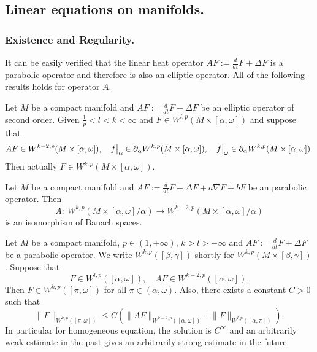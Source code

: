 \subsection{Linear equations on manifolds.}
\label{sec:org06823dd}

\subsubsection{Existence and Regularity.}
\label{sec:org8997e62}

It can be easily verified that the linear heat operator \(AF:= \frac{d}{dt}F + \Delta F\)
is a parabolic operator and therefore is also an elliptic operator. All of the following results
holds for operator \(A\).

\begin{theorem}
\label{thm:elliptic-d}
Let \(M\) be a compact manifold and \(AF:= \frac{d}{dt}F + \Delta F\) be an elliptic
operator of second order. Given \(\frac{1}{p} < l < k <\infty\) and \(F\in
W^{l,p}(M\times[\alpha,\omega])\) and suppose that 
\[
 AF\in W^{k-2,p}(M\times[\alpha,\omega]),\quad \restr{f}{\alpha}\in \partial_\alpha
W^{k,p}(M\times[\alpha,\omega]), \quad  \restr{f}{\omega}\in \partial_\alpha W^{k,p}(M\times[\alpha,\omega]).
\]
Then actually \(F\in W^{k,p}(M\times[\alpha,\omega])\).
\end{theorem}


\begin{theorem}
\label{thm:para-existence-d}
Let \(M\) be a compact manifold and \(AF:= \frac{d}{dt}F + \Delta F + a\nabla F + bF\) be an parabolic
operator. Then 
\[
 A:\ W^{k,p}(M\times[\alpha,\omega]/\alpha) \longrightarrow W^{k-2,p}(M\times[\alpha,\omega]/\alpha)
\]
is an isomorphism of Banach spaces.
\end{theorem}


\begin{theorem}
\label{thm:para-eq-d }
Let \(M\) be a compact manifold, \(p\in (1,+\infty)\), \(k > l > -\infty\) and \(AF:= \frac{d}{dt}F + \Delta F\) be a parabolic operator. We write \(W^{k,p}([\beta,\gamma])\) shortly for \(W^{k,p}(M\times[\beta,\gamma])\). Suppose that
\[
 F\in W^{l,p}([\alpha,\omega]),\quad AF\in W^{k-2,p}([\alpha,\omega]).
\]
Then \(F\in W^{k,p}([\pi,\omega])\) for all \(\pi\in (\alpha,\omega)\). Also, there
exists a constant \(C>0\) such that 
\[
 \|F\|_{W^{k,p}([\pi,\omega])} \leq C \left( \|AF\|_{W^{k-2,p}([\alpha,\omega])} + \| F \|_{W^{l,p}([\alpha,\pi])}  \right).
\]
In particular for homogeneous equation, the solution is \(C^\infty\) and an arbitrarily weak estimate in the past gives an arbitrarily strong estimate in the future. 
\end{theorem}


